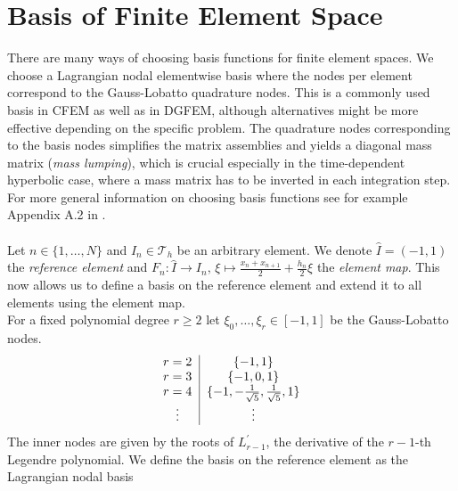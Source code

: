 \section{Basis of Finite Element Space}
\label{sec:ell_basis}
There are many ways of choosing basis functions for finite element spaces. We choose a Lagrangian
nodal elementwise basis where the nodes per element correspond to the Gauss-Lobatto quadrature nodes.
This is a commonly used basis in CFEM as well as in DGFEM, although alternatives might be more
effective depending on the specific problem. The quadrature nodes
corresponding to the basis nodes simplifies the matrix assemblies and yields a diagonal mass matrix (\textit{mass lumping}), which
is crucial especially in the time-dependent hyperbolic case, where a mass matrix has to be inverted
in each integration step. For more general information on choosing basis functions see for example
Appendix A.2 in \cite{diPietro2012}. \\ \\
Let $n\in \{1,\ldots,N\}$ and $I_n \in \mathcal{T}_h$ be an arbitrary element.
We denote $\hat{I} = (-1,1)$ the \textit{reference element} and $\displaystyle F_n : \hat{I} \to I_n, \, \xi \mapsto \frac{x_n + x_{n+1}}{2} + \frac{h_n}{2} \xi $
the \textit{element map}. This now allows us to define a basis on the reference element and
extend it to all elements using the element map. \\
For a fixed polynomial degree $r \geq 2$ let $\xi_0,\ldots,\xi_{r} \in [-1,1]$ be the
Gauss-Lobatto nodes. \\
\begin{equation*}
	\begin{tabular}{c|c}
		\centering
		$r = 2$ & $\{-1, 1\}$                                         \\
		$r = 3$ & $\{-1,0, 1\}$                                       \\
		$r = 4$ & $\{-1,-\frac{1}{\sqrt{5}}, \frac{1}{\sqrt{5}}, 1\}$ \\
		\vdots  & \vdots                                              \\
	\end{tabular}
\end{equation*}
The inner nodes are given by the roots of $L_{r-1}^{\prime}$, the derivative of the $r-1$-th Legendre polynomial.
We define the basis on the reference element as the Lagrangian nodal basis


